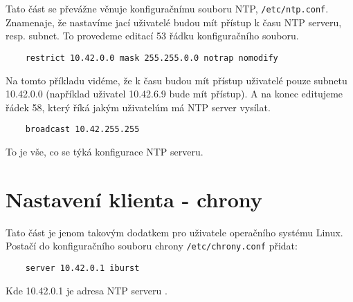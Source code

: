     Tato část se převážne věnuje konfiguračnímu souboru NTP, \verb|/etc/ntp.conf|.
    Znamenaje, že nastavíme jací uživatelé budou mít přístup k času NTP serveru, resp.
    subnet. To provedeme editací 53 řádku konfiguračního souboru.

    \begin{lstlisting}
    restrict 10.42.0.0 mask 255.255.0.0 notrap nomodify
    \end{lstlisting}

    Na tomto příkladu vidéme, že k času budou mít přístup uživatelé pouze subnetu
    10.42.0.0 (například uživatel 10.42.6.9 bude mít přístup). A na konec editujeme řádek
    58, který říká jakým uživatelúm má NTP server vysílat.

    \begin{lstlisting}
    broadcast 10.42.255.255
    \end{lstlisting}

    \noindent To je vše, co se týká konfigurace NTP serveru.

\section{Nastavení klienta - chrony}

    Tato část je jenom takovým dodatkem pro uživatele operačního systému Linux. Postačí do
    konfiguračního souboru chrony \verb|/etc/chrony.conf| přidat:

    \begin{lstlisting}
    server 10.42.0.1 iburst
    \end{lstlisting}

    \noindent Kde 10.42.0.1 je adresa NTP serveru \cite{chrony}.
